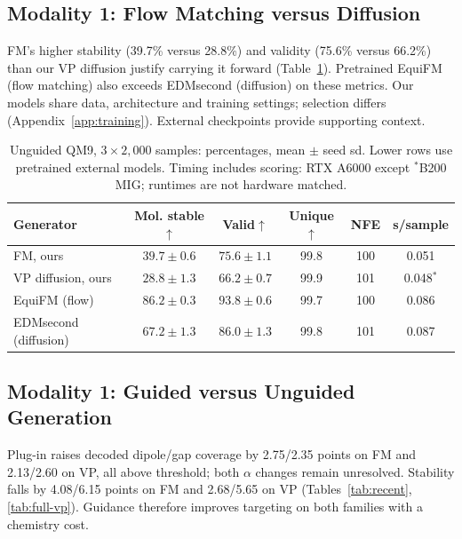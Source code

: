 \documentclass{article}
\begin{document}
\subsection{Modality 1: Flow Matching versus Diffusion}\label{sec:fmvd}
FM's higher stability (39.7\% versus 28.8\%) and validity (75.6\% versus 66.2\%) than our VP diffusion justify carrying it forward (Table~\ref{tab:fmvd}). Pretrained EquiFM (flow matching) also exceeds EDMsecond (diffusion) on these metrics. Our models share data, architecture and training settings; selection differs (Appendix~\ref{app:training}). External checkpoints provide supporting context.
\begin{table}[!htbp]
\centering\small
\caption{Unguided QM9, $3\times2{,}000$ samples: percentages, mean $\pm$ seed sd. Lower rows use pretrained external models. Timing includes scoring: RTX A6000 except $^*$B200 MIG; runtimes are not hardware matched.}
\label{tab:fmvd}
\begin{tabular}{lccccc}
\toprule
Generator & Mol. stable$\uparrow$ & Valid$\uparrow$ & Unique$\uparrow$ & NFE & s/sample\\
\midrule
FM, ours & $39.7\pm0.6$ & $75.6\pm1.1$ & 99.8 & 100 & 0.051\\
VP diffusion, ours & $28.8\pm1.3$ & $66.2\pm0.7$ & 99.9 & 101 & 0.048$^{*}$\\
\midrule
EquiFM (flow) & $86.2\pm0.3$ & $93.8\pm0.6$ & 99.7 & 100 & 0.086\\
EDMsecond (diffusion) & $67.2\pm1.3$ & $86.0\pm1.3$ & 99.8 & 101 & 0.087\\
\bottomrule
\end{tabular}
\end{table}

\subsection{Modality 1: Guided versus Unguided Generation}\label{sec:guidworks}
Plug-in raises decoded dipole/gap coverage by 2.75/2.35 points on FM and 2.13/2.60 on VP, all above threshold; both $\alpha$ changes remain unresolved. Stability falls by 4.08/6.15 points on FM and 2.68/5.65 on VP (Tables~\ref{tab:recent}, \ref{tab:full-vp}). Guidance therefore improves targeting on both families with a chemistry cost.
\end{document}
